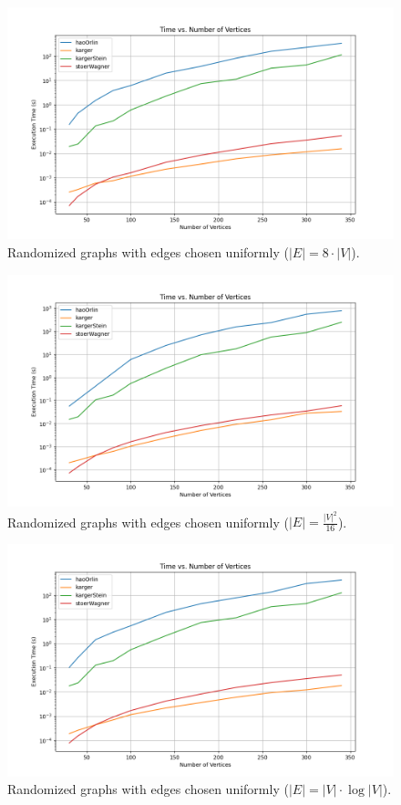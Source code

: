 \begin{figure}[H]
\centering
\includegraphics[width=\textwidth]{chapters/benchmark/Sections/images/min-cut/edges_times_8/time_vs_vertices.png}
\caption{ Randomized graphs with edges chosen uniformly (\(|E| = 8 \cdot |V|\)).}
\end{figure}

\begin{figure}[H]
\centering
\includegraphics[width=\textwidth]{chapters/benchmark/Sections/images/min-cut/edges_square_dev_16/time_vs_vertices.png}
\caption{ Randomized graphs with edges chosen uniformly (\(|E| = \frac{|V|^2}{16}\)).}
\end{figure}

\begin{figure}[H]
\centering
\includegraphics[width=\textwidth]{chapters/benchmark/Sections/images/min-cut/edges_v_times_log/time_vs_vertices.png}
\caption{ Randomized graphs with edges chosen uniformly (\(|E| = |V| \cdot \log{|V|}\)).}
\end{figure}

